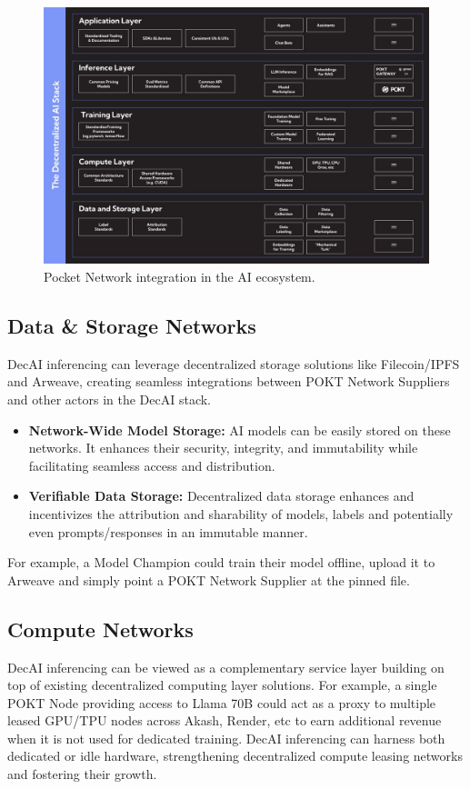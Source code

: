 \documentclass[conference,compsoc]{IEEEtran}
\begin{document}
\begin{figure}[!h]
\centering
\includegraphics[width=0.9\linewidth]{stack.jpeg}
\caption{Pocket Network integration in the AI ecosystem.}
\label{fig_stack}
\end{figure}

\subsection{Data \& Storage Networks}
DecAI inferencing can leverage decentralized storage solutions like Filecoin/IPFS and Arweave, creating seamless integrations between POKT Network Suppliers and other actors in the DecAI stack.

\begin{itemize}
    \item \textbf{Network-Wide Model Storage:} AI models can be easily stored on these networks. It enhances their security, integrity, and immutability while facilitating seamless access and distribution.

    \item \textbf{Verifiable Data Storage:} Decentralized data storage enhances and incentivizes the attribution and sharability of models, labels and potentially even prompts/responses in an immutable manner.

\end{itemize}
For example, a Model Champion could train their model offline, upload it to Arweave and simply point a POKT Network Supplier at the pinned file.


\subsection{Compute Networks}
DecAI inferencing can be viewed as a complementary service layer building on top of existing decentralized computing layer solutions. For example, a single POKT Node providing access to Llama 70B could act as a proxy to multiple leased GPU/TPU nodes across Akash, Render, etc to earn additional revenue when it is not used for dedicated training. DecAI inferencing can harness both dedicated or idle hardware, strengthening decentralized compute leasing networks and fostering their growth.
\end{document}
